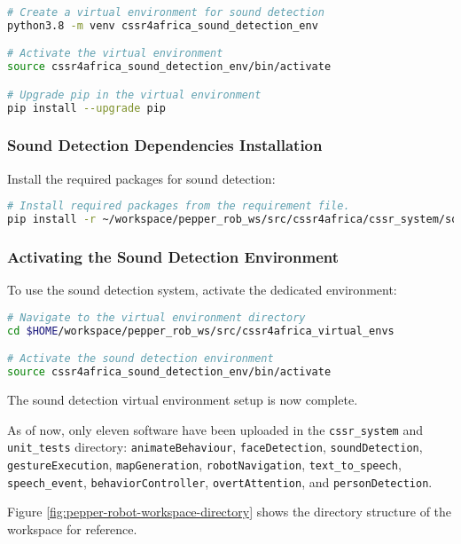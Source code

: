 \documentclass{CSSRforAfrica}
\begin{document}
{\begin{lstlisting}[style=withoutNumbering, language=bash]
# Create a virtual environment for sound detection
python3.8 -m venv cssr4africa_sound_detection_env

# Activate the virtual environment
source cssr4africa_sound_detection_env/bin/activate

# Upgrade pip in the virtual environment
pip install --upgrade pip
\end{lstlisting}

\subsubsection*{Sound Detection Dependencies Installation}
Install the required packages for sound detection:
\begin{lstlisting}[style=withoutNumbering, language=bash]
# Install required packages from the requirement file.
pip install -r ~/workspace/pepper_rob_ws/src/cssr4africa/cssr_system/sound_detection/sound_detection_requirements.txt
\end{lstlisting}

\subsubsection*{Activating the Sound Detection Environment}
To use the sound detection system, activate the dedicated environment:
\begin{lstlisting}[style=withoutNumbering, language=bash]
# Navigate to the virtual environment directory
cd $HOME/workspace/pepper_rob_ws/src/cssr4africa_virtual_envs

# Activate the sound detection environment
source cssr4africa_sound_detection_env/bin/activate
\end{lstlisting}

The sound detection virtual environment setup is now complete.

\newpage

As of now, only eleven software have been uploaded in the \texttt{cssr\_system} and \texttt{unit\_tests} directory: \texttt{animateBehaviour}, \texttt{faceDetection}, \texttt{soundDetection}, \texttt{gestureExecution}, \texttt{mapGeneration}, \texttt{robotNavigation}, \texttt{text\_to\_speech}, \texttt{speech\_event},  \texttt{behaviorController}, \texttt{overtAttention}, $ $and \texttt{personDetection}. 

Figure \ref{fig:pepper-robot-workspace-directory} shows the directory structure of the workspace for reference.
\begin{figure}[ht]


\end{figure}}
\end{document}
